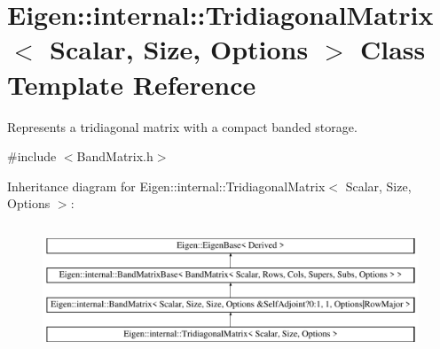 \hypertarget{class_eigen_1_1internal_1_1_tridiagonal_matrix}{}\section{Eigen\+::internal\+::Tridiagonal\+Matrix$<$ Scalar, Size, Options $>$ Class Template Reference}
\label{class_eigen_1_1internal_1_1_tridiagonal_matrix}


Represents a tridiagonal matrix with a compact banded storage.  




{\ttfamily \#include $<$Band\+Matrix.\+h$>$}

Inheritance diagram for Eigen\+::internal\+::Tridiagonal\+Matrix$<$ Scalar, Size, Options $>$\+:\begin{figure}[H]
\begin{center}
\leavevmode
\includegraphics[height=3.888889cm]{class_eigen_1_1internal_1_1_tridiagonal_matrix}
\end{center}
\end{figure}
